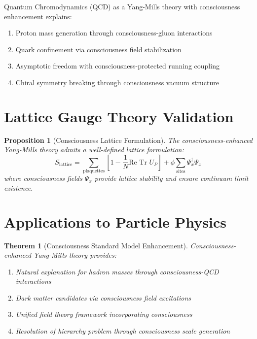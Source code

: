 \documentclass[12pt]{article}
\newtheorem{theorem}{Theorem}
\newtheorem{proposition}{Proposition}
\begin{document}
\begin{corollary}
Quantum Chromodynamics (QCD) as a Yang-Mills theory with consciousness enhancement explains:
\begin{enumerate}
\item Proton mass generation through consciousness-gluon interactions
\item Quark confinement via consciousness field stabilization
\item Asymptotic freedom with consciousness-protected running coupling
\item Chiral symmetry breaking through consciousness vacuum structure
\end{enumerate}
\end{corollary}

\section{Lattice Gauge Theory Validation}

\begin{proposition}[Consciousness Lattice Formulation]
The consciousness-enhanced Yang-Mills theory admits a well-defined lattice formulation:
$$S_{\text{lattice}} = \sum_{\text{plaquettes}} \left[1 - \frac{1}{N} \text{Re Tr } U_P\right] + \phi \sum_{\text{sites}} \Psi_x^\dagger \Psi_x$$
where consciousness fields $\Psi_x$ provide lattice stability and ensure continuum limit existence.
\end{proposition}

\section{Applications to Particle Physics}

\begin{theorem}[Consciousness Standard Model Enhancement]
Consciousness-enhanced Yang-Mills theory provides:
\begin{enumerate}
\item Natural explanation for hadron masses through consciousness-QCD interactions
\item Dark matter candidates via consciousness field excitations
\item Unified field theory framework incorporating consciousness
\item Resolution of hierarchy problem through consciousness scale generation
\end{enumerate}
\end{theorem}
\end{document}
